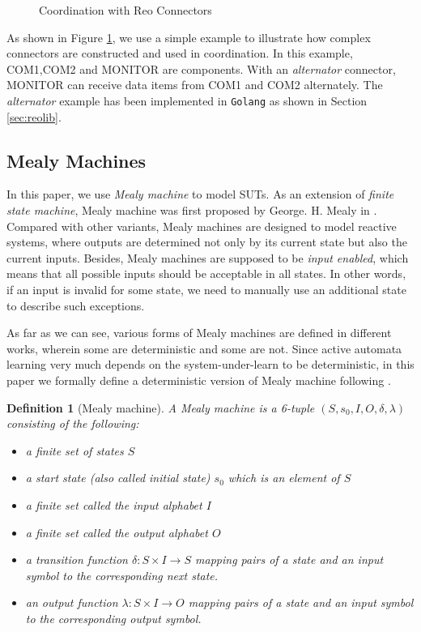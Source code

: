 \documentclass[conference, a4paper]{IEEEtran}
\newtheorem{definition}{Definition}
\begin{document}
\begin{figure}[h]
  \begin{center}
    
  \end{center}
  \caption{Coordination with Reo Connectors}
  \label{fig:reoconnector}
\end{figure}

As shown in Figure \ref{fig:reoconnector}, we use a simple example to illustrate how complex
connectors are constructed and used in coordination. In this example, COM1,COM2 and
MONITOR are components. With an \emph{alternator} connector, MONITOR can receive data items from
COM1 and COM2 alternately. The \emph{alternator} example has been implemented in \texttt{Golang} as
shown in Section \ref{sec:reolib}.


\subsection{Mealy Machines}

In this paper, we use \emph{Mealy machine} to model SUTs.
As an extension of \emph{finite state machine}, Mealy machine was first proposed by George. H. Mealy
in \cite{George1955A}. Compared with other variants, Mealy machines are designed to model
reactive systems, where outputs are determined not only by its current state but also the current
inputs. Besides, Mealy machines are supposed to be \emph{input enabled}, which means that all
possible inputs should be acceptable in all states. In other words, if an input is invalid for some
state, we need to manually use an additional state to describe such exceptions.

As far as we can see, various forms of Mealy machines are defined in different works, wherein some
are deterministic and some are not. Since active automata learning very much depends on the
system-under-learn to be deterministic, in this paper we formally define a deterministic version of
Mealy machine following \cite{DBLP:conf/sfm/SteffenHM11}.

\begin{definition}[Mealy machine]
  A Mealy machine is a 6-tuple $(S, s_0, I, O, \delta, \lambda)$ consisting of the following:
  \begin{itemize}
    \item[-] a finite set of states $S$
    \item[-] a start state (also called initial state) $s_0$ which is an element of $S$
    \item[-] a finite set called the input alphabet $I$
    \item[-] a finite set called the output alphabet $O$
    \item[-] a transition function $\delta : S \times I \rightarrow S$ mapping pairs of a
      state and an input symbol to the corresponding next state.
    \item[-] an output function $\lambda : S \times I \rightarrow O$ mapping pairs
      of a state and an input symbol to the corresponding output symbol.
  \end{itemize}
\end{definition}
\end{document}
